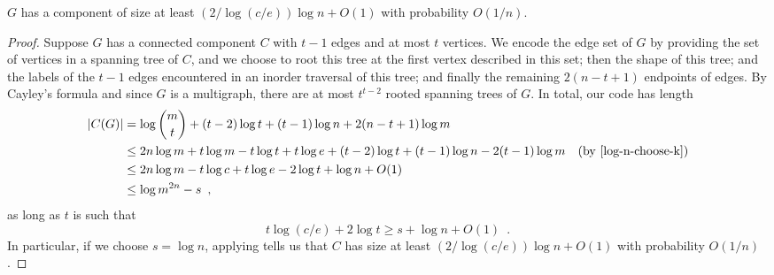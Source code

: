 \documentclass{patmorin}
\begin{document}
\begin{lem}
  $G$ has a component of size at least $(2/\log(c/e))\log n + O(1)$
  with probability $O(1/n)$.
\end{lem}
\begin{proof}
  Suppose $G$ has a connected component $C$ with $t - 1$ edges and at
  most $t$ vertices. We encode the edge set of $G$ by providing the
  set of vertices in a spanning tree of $C$, and we choose to root
  this tree at the first vertex described in this set; then the shape
  of this tree; and the labels of the $t - 1$ edges encountered in an
  inorder traversal of this tree; and finally the remaining
  $2(n - t + 1)$ endpoints of edges. By Cayley's formula and since $G$
  is a multigraph, there are at most $t^{t - 2}$ rooted spanning trees
  of $G$. In total, our code has length
  \begin{align*}
    |C(G)| &= \log \binom{m}{t} + (t - 2) \log t + (t - 1) \log n + 2 (n - t + 1) \log m \\
           &\le 2n \log m + t\log m - t\log t + t\log e + (t-2)\log t + (t-1)\log n - 2(t-1)\log m & \text{(by \eqref{log-n-choose-k})} \\
           &\le 2n \log m - t\log c + t\log e - 2\log t + \log n + O(1) \\
           &\le \log m^{2n} - s \enspace ,
  \end{align*}
  as long as $t$ is such that
  \[t \log (c/e) + 2\log t \geq s + \log n + O(1) \enspace .\]
  In particular, if we choose $s = \log n$, applying 
  tells us that $C$ has size at least $(2/\log (c/e))\log n + O(1)$
  with probability $O(1/n)$.
\end{proof}
\end{document}
